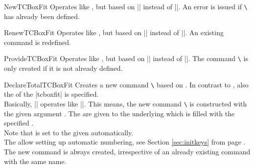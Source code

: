 \begin{docCommand}{NewTCBoxFit}{}
  Operates like , but based on |\NewDocumentCommand| instead of |\DeclareDocumentCommand|.
  An error is issued if \texttt{\textbackslash} has already been defined.
\end{docCommand}

\begin{docCommand}{RenewTCBoxFit}{}
  Operates like , but based on |\RenewDocumentCommand| instead of |\DeclareDocumentCommand|.
  An existing command is redefined.
\end{docCommand}

\begin{docCommand}{ProvideTCBoxFit}{}
  Operates like , but based on |\ProvideDocumentCommand| instead of |\DeclareDocumentCommand|.
  The command \texttt{\textbackslash} is only created if it is not already defined.
\end{docCommand}

\clearpage

\begin{docCommand}{DeclareTotalTCBoxFit}{}
  Creates a new command \texttt{\textbackslash} based on .
  In contrast to , also the  of the |tcboxfit| is specified.\\
  Basically, |\DeclareTotalTCBoxFit| operates like |\DeclareDocumentCommand|. This means,
  the new command \texttt{\textbackslash} is constructed with the given argument .
  The  are given to the underlying  which is filled with
  the specified .\\
  Note that  is set to the given 
  automatically.\\
  The  allow setting up automatic numbering,
  see Section \ref{sec:initkeys} from page \pageref{sec:initkeys}.\\
  The new command is always created, irrespective of an already existing
  command with the same name.

\end{docCommand}

